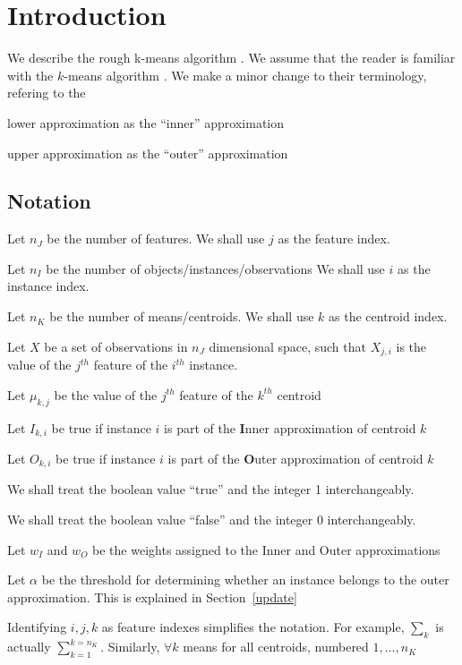
\section{Introduction}

We describe the rough k-means algorithm \cite{Peters2012}. 
We assume that the reader is familiar with the \(k\)-means algorithm
\cite{Hastie2009}. We make a minor change to their terminology, 
refering to the 
\bi
\item lower approximation as the ``inner'' approximation
\item upper approximation as the ``outer'' approximation
\ei

\subsection{Notation}

\be
\item Let \(n_J\) be the number of features. 
We shall use \(j\) as the feature index. 
\item Let \(n_I\) be the number of objects/instances/observations
We shall use \(i\) as the instance index. 
\item Let \(n_K\) be the number of means/centroids.
We shall use \(k\) as the centroid index. 
\item Let \(X\) be a set of observations in \(n_J\) dimensional space, 
such that \(X_{j, i}\) is the value of the \(j^{th}\) feature of 
the \(i^{th}\) instance. 
\item Let \(\mu_{k, j}\) be the value of the \(j^{th}\) feature of the \(k^{th}\)
centroid
\item Let \(I_{k, i}\) be true if instance \(i\) is part of the 
{\bf I}nner approximation of centroid \(k\)
\item Let \(O_{k, i}\) be true if instance \(i\) is part of the 
{\bf O}uter approximation of centroid \(k\)
\item We shall treat the boolean value ``true'' and the integer
1 interchangeably. 
\item We shall treat the boolean value ``false'' and the integer
0 interchangeably. 
\item Let \(w_I\) and \(w_O\) be the weights assigned to the Inner and Outer
approximations
\item Let \(\alpha\) be the threshold for determining whether an instance
belongs to the outer approximation. This is explained in 
Section~\ref{update}
\item Identifying \(i, j, k\) as feature indexes simplifies the notation. For
example, \(\sum_k\) is actually \(\sum_{k=1}^{k=n_K}\). Similarly, \(\forall k\)
means for all centroids, numbered \(1, \ldots, n_K\)
\ee

